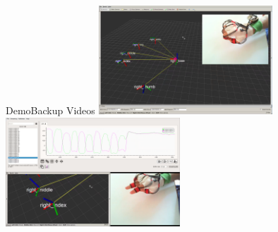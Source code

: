 \begin{frame}{Demo}{Backup Videos}
    \vfill%
    \includegraphics[width=0.49\textwidth]{../demo/01-rviz}
    \hfill
    \includegraphics[width=0.49\textwidth]{../demo/02-plotjuggler}
\end{frame}

